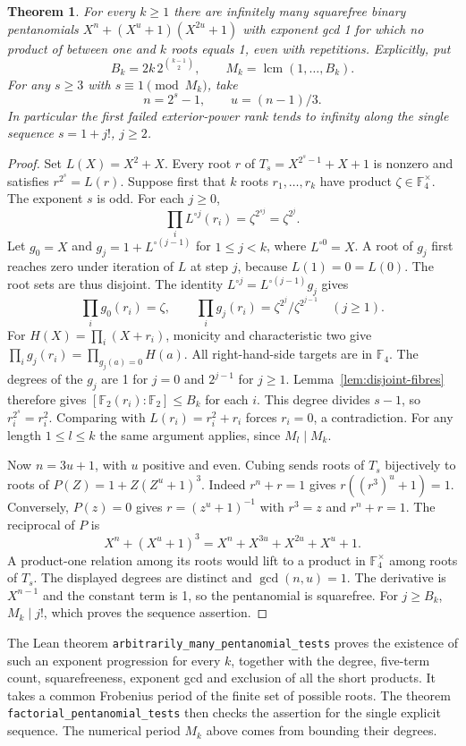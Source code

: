 \documentclass[11pt]{article}
\newtheorem{theorem}{Theorem}
\newcommand{\F}{\mathbb F_2}
\begin{document}
\begin{theorem}\label{thm:unbounded-ranks}
For every \(k\ge1\) there are infinitely many squarefree binary
pentanomials \(X^n+(X^u+1)(X^{2u}+1)\) with exponent gcd 1
for which no product of between one and \(k\) roots equals 1,
even with repetitions. Explicitly, put
\[
 B_k=2k\,2^{\binom{k-1}{2}},\qquad M_k=\operatorname{lcm}(1,\ldots,B_k).
\]
For any \(s\ge3\) with \(s\equiv1\pmod{M_k}\), take
\[
             n=2^s-1,\qquad u=(n-1)/3 .
\]
In particular the first failed exterior-power rank tends to infinity
along the single sequence \(s=1+j!\), \(j\ge2\).
\end{theorem}
\begin{proof}
Set \(L(X)=X^2+X\). Every root \(r\) of \(T_s=X^{2^s-1}+X+1\)
is nonzero and satisfies \(r^{2^s}=L(r)\). Suppose first that \(k\)
roots \(r_1,\ldots,r_k\) have product \(\zeta\in\mathbb F_4^\times\).
The exponent \(s\) is odd. For each \(j\ge0\),
\[
    \prod_i L^{\circ j}(r_i)=\zeta^{2^{sj}}=\zeta^{2^j}.
\]
Let \(g_0=X\) and \(g_j=1+L^{\circ(j-1)}\) for \(1\le j<k\),
where \(L^{\circ0}=X\). A root of \(g_j\) first reaches zero under
iteration of \(L\) at step \(j\), because \(L(1)=0=L(0)\).
The root sets are thus disjoint. The identity
\(L^{\circ j}=L^{\circ(j-1)}g_j\) gives
\[
      \prod_i g_0(r_i)=\zeta,\qquad
      \prod_i g_j(r_i)=\zeta^{2^j}/\zeta^{2^{j-1}}\quad(j\ge1).
\]
For \(H(X)=\prod_i(X+r_i)\), monicity and characteristic two give
\(\prod_i g_j(r_i)=\prod_{g_j(a)=0}H(a)\). All right-hand-side
targets are in \(\mathbb F_4\). The degrees of the \(g_j\) are 1
for \(j=0\) and \(2^{j-1}\) for \(j\ge1\). Lemma~\ref{lem:disjoint-fibres}
therefore gives \([\F(r_i):\F]\le B_k\) for each \(i\).
This degree divides \(s-1\), so \(r_i^{2^s}=r_i^2\).
Comparing with \(L(r_i)=r_i^2+r_i\) forces \(r_i=0\), a contradiction.
For any length \(1\le l\le k\) the same argument applies, since
\(M_l\mid M_k\).

Now \(n=3u+1\), with \(u\) positive and even. Cubing sends roots of
\(T_s\) bijectively to roots of \(P(Z)=1+Z(Z^u+1)^3\).
Indeed \(r^n+r=1\) gives \(r((r^3)^u+1)=1\).
Conversely, \(P(z)=0\) gives \(r=(z^u+1)^{-1}\) with \(r^3=z\)
and \(r^n+r=1\). The reciprocal of \(P\) is
\[
       X^n+(X^u+1)^3=X^n+X^{3u}+X^{2u}+X^u+1 .
\]
A product-one relation among its roots would lift to a product
in \(\mathbb F_4^\times\) among roots of \(T_s\). The displayed
degrees are distinct and \(\gcd(n,u)=1\). The derivative is \(X^{n-1}\)
and the constant term is 1, so the pentanomial is squarefree.
For \(j\ge B_k\), \(M_k\mid j!\), which proves the sequence assertion.
\end{proof}
The Lean theorem \texttt{arbitrarily\_many\_pentanomial\_tests} proves
the existence of such an exponent progression for every \(k\), together
with the degree, five-term count, squarefreeness, exponent gcd and
exclusion of all the short products. It takes a common Frobenius period
of the finite set of possible roots. The theorem
\texttt{factorial\_pentanomial\_tests} then checks the assertion for the
single explicit sequence. The numerical period \(M_k\) above comes
from bounding their degrees.
\end{document}
